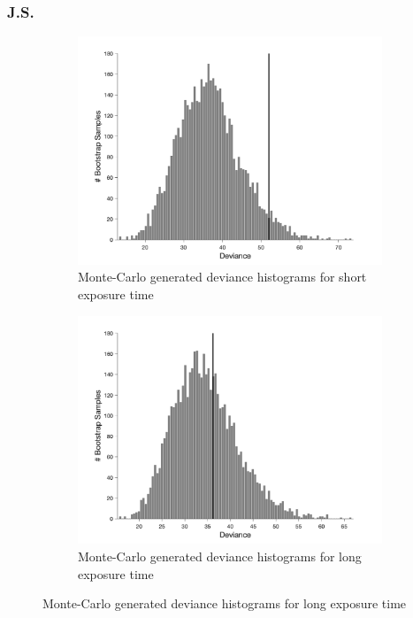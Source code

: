 \documentclass{article}
\begin{document}
\subsubsection*{J.S.}
\begin{figure}[!hb]
    \begin{subfigure}{0.494\textwidth}
        \centering
        \includegraphics[width = \linewidth]{Thesis/plots/gof/segDist/segDist_js_short_bootstrap.png}
        \caption{Monte-Carlo generated deviance histograms for short exposure time}
        \label{fig:da_gof_short_bootstrap}
    \end{subfigure}
    \hspace{0.01\textwidth}
    \begin{subfigure}{0.494\textwidth}
        \centering
        \includegraphics[width = \linewidth]{Thesis/plots/gof/segDist/segDist_js_long_bootstrap.png}
        \caption{Monte-Carlo generated deviance histograms for long exposure time}
        \label{fig:da_gof_long_bootstrap}
    \end{subfigure}
    

\end{figure}
\end{document}
